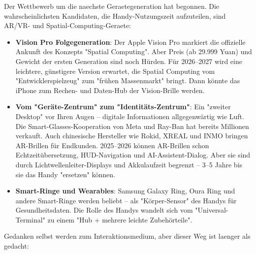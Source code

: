 


Der Wettbewerb um die naechste Geraetegeneration hat begonnen. Die wahrscheinlichsten Kandidaten, die Handy-Nutzungszeit aufzuteilen, sind AR/VR- und Spatial-Computing-Geraete:

\begin{itemize}
  \item \textbf{Vision Pro Folgegeneration}: Der Apple Vision Pro markiert die offizielle Ankunft des Konzepts "Spatial Computing". Aber Preis (ab 29.999 Yuan) und Gewicht der ersten Generation sind noch Hürden. Für 2026–2027 wird eine leichtere, günstigere Version erwartet, die Spatial Computing vom "Entwicklerspielzeug" zum "frühen Massenmarkt" bringt. Dann könnte das iPhone zum Rechen- und Daten-Hub der Vision-Brille werden.
  \item \textbf{Vom "Geräte-Zentrum" zum "Identitäts-Zentrum"}: Ein "zweiter Desktop" vor Ihren Augen – digitale Informationen allgegenwärtig wie Luft. Die Smart-Glasses-Kooperation von Meta und Ray-Ban hat bereits Millionen verkauft. Auch chinesische Hersteller wie Rokid, XREAL und INMO bringen AR-Brillen für Endkunden. 2025–2026 können AR-Brillen schon Echtzeitübersetzung, HUD-Navigation und AI-Assistent-Dialog. Aber sie sind durch Lichtwellenleiter-Displays und Akkulaufzeit begrenzt – 3–5 Jahre bis sie das Handy "ersetzen" können.
  \item \textbf{Smart-Ringe und Wearables}: Samsung Galaxy Ring, Oura Ring und andere Smart-Ringe werden beliebt – als "Körper-Sensor" des Handys für Gesundheitsdaten. Die Rolle des Handys wandelt sich vom "Universal-Terminal" zu einem "Hub + mehrere leichte Zubehörteile".
\end{itemize}


Gedanken selbst werden zum Interaktionsmedium, aber dieser Weg ist laenger als gedacht:

